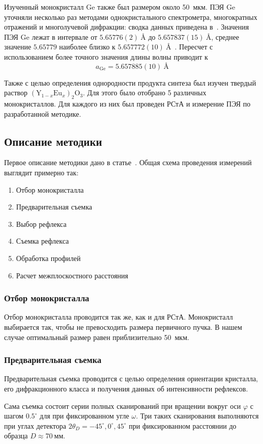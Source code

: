 \documentclass[a4paper,14pt]{extarticle}
\newcommand{\unit}[1]{ \ \text{#1}}
\newcommand{\degree}{^\circ}
\newcommand{\YEu}{${(\text{Y}_{1-x}\text{Eu}_x)}_2\text{O}_3$}
\begin{document}
Изученный монокристалл Ge также был размером около 50~мкм.
ПЭЯ Ge уточняли несколько раз методами однокристального спектрометра, многократных отражений и многолучевой дифракции: сводка данных приведена в~\cite{Lisoivan:1982}.
Значения ПЭЯ Ge лежат в интервале от $5.65776 (2)\unit{\AA}$ до $5.657837 (15)\unit{\AA}$, среднее значение $5.65779$ наиболее близко к $5.657772 (10)\unit{\AA}$~\cite{Cooper:1962}.
Пересчет с использованием более точного значения длины волны приводит к
\[ a_\text{Ge} = 5.657885 (10)\unit{\AA} \]

Также с целью определения однородности продукта синтеза был изучен твердый раствор \YEu.
Для этого было отобрано 5 различных монокристаллов.
Для каждого из них был проведен РСтА и измерение ПЭЯ по разработанной методике.

\subsection{Описание методики}
Первое описание методики дано в статье~\cite{Kudryavtsev:2024:YEu}.
Общая схема проведения измерений выглядит примерно так:
\begin{enumerate}
    \item Отбор монокристалла
    \item Предварительная съемка
    \item Выбор рефлекса
    \item Съемка рефлекса
    \item Обработка профилей
    \item Расчет межплоскостного расстояния
\end{enumerate}
\subsubsection{Отбор монокристалла}
Отбор монокристалла проводится так же, как и для РСтА.
Монокристалл выбирается так, чтобы не превосходить размера первичного пучка.
В нашем случае оптимальный размер равен приблизительно 50~мкм.
\subsubsection{Предварительная съемка}
Предварительная съемка проводится с целью определения ориентации кристалла, его дифракционного класса и получения данных об интенсивности рефлексов.

Сама съемка состоит серии полных сканирований при вращении вокруг оси $\varphi$ с шагом $0.5\degree$ для при фиксированном угле $\omega$.
Три таких сканирования выполняются при углах детектора $2\theta_D = -45\degree, 0\degree, 45\degree$ при фиксированном расстоянии до образца $D \approx 70\unit{мм}$.
\end{document}
